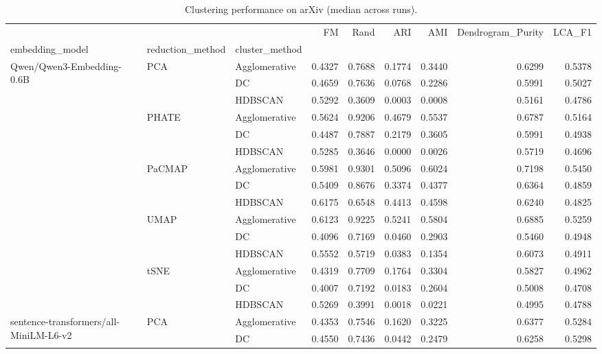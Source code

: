 \begin{table}
\caption{Clustering performance on arXiv (median across runs).}
\label{tab:arxiv_results}
\begin{tabular}{lllrrrrrr}
\toprule
 &  &  & FM & Rand & ARI & AMI & Dendrogram_Purity & LCA_F1 \\
embedding_model & reduction_method & cluster_method &  &  &  &  &  &  \\
\midrule
\multirow[t]{15}{*}{Qwen/Qwen3-Embedding-0.6B} & \multirow[t]{3}{*}{PCA} & Agglomerative & 0.4327 & 0.7688 & 0.1774 & 0.3440 & 0.6299 & 0.5378 \\
 &  & DC & 0.4659 & 0.7636 & 0.0768 & 0.2286 & 0.5991 & 0.5027 \\
 &  & HDBSCAN & 0.5292 & 0.3609 & 0.0003 & 0.0008 & 0.5161 & 0.4786 \\
\cline{2-9}
 & \multirow[t]{3}{*}{PHATE} & Agglomerative & 0.5624 & 0.9206 & 0.4679 & 0.5537 & 0.6787 & 0.5164 \\
 &  & DC & 0.4487 & 0.7887 & 0.2179 & 0.3605 & 0.5991 & 0.4938 \\
 &  & HDBSCAN & 0.5285 & 0.3646 & 0.0000 & 0.0026 & 0.5719 & 0.4696 \\
\cline{2-9}
 & \multirow[t]{3}{*}{PaCMAP} & Agglomerative & 0.5981 & 0.9301 & 0.5096 & 0.6024 & 0.7198 & 0.5450 \\
 &  & DC & 0.5409 & 0.8676 & 0.3374 & 0.4377 & 0.6364 & 0.4859 \\
 &  & HDBSCAN & 0.6175 & 0.6548 & 0.4413 & 0.4598 & 0.6240 & 0.4825 \\
\cline{2-9}
 & \multirow[t]{3}{*}{UMAP} & Agglomerative & 0.6123 & 0.9225 & 0.5241 & 0.5804 & 0.6885 & 0.5259 \\
 &  & DC & 0.4096 & 0.7169 & 0.0460 & 0.2903 & 0.5460 & 0.4948 \\
 &  & HDBSCAN & 0.5552 & 0.5719 & 0.0383 & 0.1354 & 0.6073 & 0.4911 \\
\cline{2-9}
 & \multirow[t]{3}{*}{tSNE} & Agglomerative & 0.4319 & 0.7709 & 0.1764 & 0.3304 & 0.5827 & 0.4962 \\
 &  & DC & 0.4007 & 0.7192 & 0.0183 & 0.2604 & 0.5008 & 0.4708 \\
 &  & HDBSCAN & 0.5269 & 0.3991 & 0.0018 & 0.0221 & 0.4995 & 0.4788 \\
\cline{1-9} \cline{2-9}
\multirow[t]{15}{*}{sentence-transformers/all-MiniLM-L6-v2} & \multirow[t]{3}{*}{PCA} & Agglomerative & 0.4353 & 0.7546 & 0.1620 & 0.3225 & 0.6377 & 0.5284 \\
 &  & DC & 0.4550 & 0.7436 & 0.0442 & 0.2479 & 0.6258 & 0.5298 \\

\end{tabular}
\end{table}
